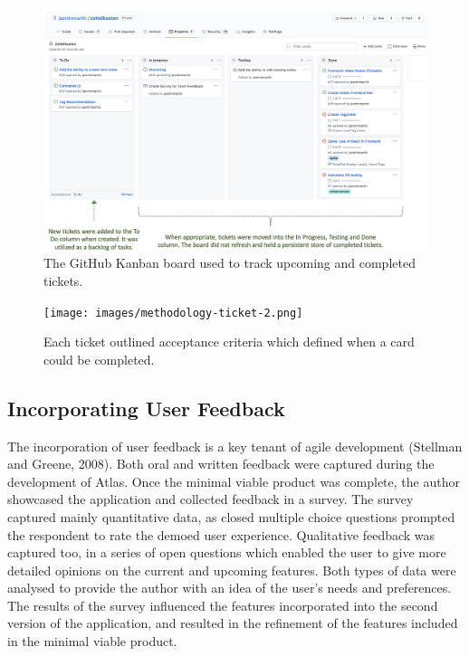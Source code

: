 \documentclass{article}
\begin{document}
\begin{figure}[!htb]
  \centering
      \includegraphics[width=1\textwidth]{images/methodology-ticket.png}
  \caption{The GitHub Kanban board used to track upcoming and completed tickets.}
  \label{fig:ticket}
\end{figure}

\begin{figure}[!b]
  \centering
      \texttt{[image: images/methodology-ticket-2.png]}
  \caption{Each ticket outlined acceptance criteria which defined when a card could be completed.}
    \label{fig:board}
\end{figure}

\newpage
\subsection{Incorporating User Feedback}

The incorporation of user feedback is a key tenant of agile development (Stellman and Greene, 2008). Both oral and written feedback were captured during the development of Atlas. Once the minimal viable product was complete, the author showcased the application and collected feedback in a survey. The survey captured mainly quantitative data, as closed multiple choice questions prompted the respondent to rate the demoed user experience. Qualitative feedback was captured too, in a series of open questions which enabled the user to give more detailed opinions on the current and upcoming features. Both types of data were analysed to provide the author with an idea of the user’s needs and preferences. The results of the survey influenced the features incorporated into the second version of the application, and resulted in the refinement of the features included in the minimal viable product.
\end{document}
